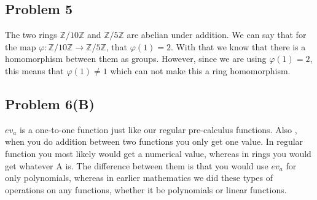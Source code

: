 \documentclass[12pt]{article}
\newcommand{\Z}{\mathbb{Z}}
\begin{document}
\subsection*{Problem 5}
The two rings $\Z/10\Z$ and $\Z/5\Z$ are abelian under addition. We can say that for the map $\varphi: \Z/10\Z \rightarrow \Z/5\Z$, that $\varphi(1) = 2$. With that we know that there is a homomorphism between them as groups. However, since we are using $\varphi(1) = 2$, this means that $\varphi(1) \neq 1$ which can not make this a ring homomorphism. 

\subsection*{Problem 6(B)}
$ev_a$ is a one-to-one function just like our regular pre-calculus functions. Also , when you do addition between two functions you only get one value. In regular function you most likely would get a numerical value, whereas in rings you would get whatever A is. The difference between them is that you would use $ev_a$ for only polynomials, whereas in earlier mathematics we did these types of operations on any functions, whether it be polynomials or linear functions.
\end{document}
